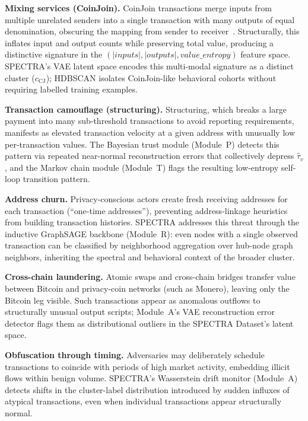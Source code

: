 \documentclass[journal]{IEEEtran}
\newcommand{\spectra}{\textsc{SPECTRA}}
\begin{document}
\textbf{Mixing services (CoinJoin).}
CoinJoin transactions merge inputs from multiple unrelated senders into a
single transaction with many outputs of equal denomination, obscuring the
mapping from sender to receiver~\cite{Dudani2023,Chang2025}.
Structurally, this inflates input and output counts while preserving total
value, producing a distinctive signature in the $(|\mathit{inputs}|,
|\mathit{outputs}|, \mathit{value\_entropy})$ feature space.
\spectra{}'s VAE latent space encodes this multi-modal signature as a
distinct cluster ($c_{\text{CJ}}$); HDBSCAN isolates CoinJoin-like
behavioral cohorts without requiring labelled training examples.

\textbf{Transaction camouflage (structuring).}
Structuring, which breaks a large payment into many sub-threshold transactions
to avoid reporting requirements, manifests as elevated transaction velocity
at a given address with unusually low per-transaction values.
The Bayesian trust module (Module~P) detects this pattern via repeated
near-normal reconstruction errors that collectively depress $\hat{\tau}_v$,
and the Markov chain module (Module~T) flags the resulting low-entropy
self-loop transition pattern.

\textbf{Address churn.}
Privacy-conscious actors create fresh receiving addresses for each transaction
(``one-time addresses''), preventing address-linkage heuristics~\cite{Chang2025}
from building transaction histories.
\spectra{} addresses this threat through the inductive GraphSAGE backbone
(Module~R): even nodes with a single observed transaction can be classified
by neighborhood aggregation over hub-node graph neighbors, inheriting
the spectral and behavioral context of the broader cluster.

\textbf{Cross-chain laundering.}
Atomic swaps and cross-chain bridges transfer value between Bitcoin and
privacy-coin networks (such as Monero), leaving only the Bitcoin leg visible.
Such transactions appear as anomalous outflows to structurally unusual
output scripts; Module~A's VAE reconstruction error detector flags them as
distributional outliers in the SPECTRA Dataset's latent space.

\textbf{Obfuscation through timing.}
Adversaries may deliberately schedule transactions to coincide with periods
of high market activity, embedding illicit flows within benign volume.
\spectra{}'s Wasserstein drift monitor (Module~A) detects shifts in the
cluster-label distribution introduced by sudden influxes of atypical
transactions, even when individual transactions appear structurally normal.
\end{document}
